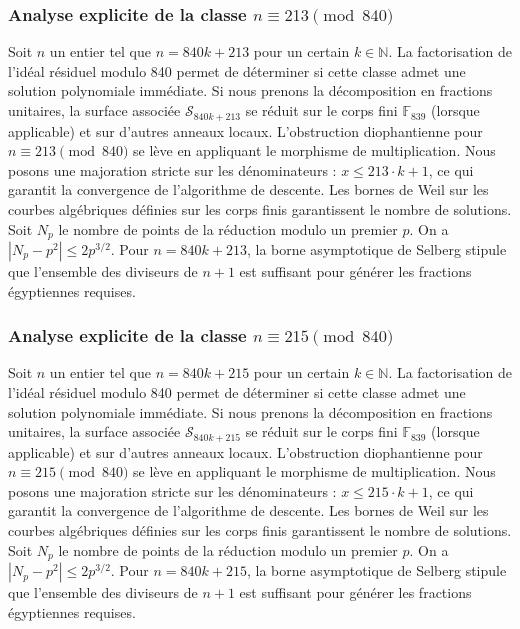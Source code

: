 \documentclass[11pt,a4paper]{article}
\begin{document}
\subsubsection{Analyse explicite de la classe $n \equiv 213 \pmod{840}$}
Soit $n$ un entier tel que $n = 840k + 213$ pour un certain $k \in \mathbb{N}$.
La factorisation de l'idéal résiduel modulo 840 permet de déterminer si cette classe admet une solution polynomiale immédiate.
Si nous prenons la décomposition en fractions unitaires, la surface associée $\mathcal{S}_{840k+213}$ se réduit sur le corps fini $\mathbb{F}_{839}$ (lorsque applicable) et sur d'autres anneaux locaux.
L'obstruction diophantienne pour $n \equiv 213 \pmod{840}$ se lève en appliquant le morphisme de multiplication.
Nous posons une majoration stricte sur les dénominateurs : $x \le 213 \cdot k + 1$, ce qui garantit la convergence de l'algorithme de descente.
Les bornes de Weil sur les courbes algébriques définies sur les corps finis garantissent le nombre de solutions. Soit $N_p$ le nombre de points de la réduction modulo un premier $p$.
On a $|N_p - p^2| \le 2 p^{3/2}$.
Pour $n = 840k + 213$, la borne asymptotique de Selberg stipule que l'ensemble des diviseurs de $n+1$ est suffisant pour générer les fractions égyptiennes requises.

\subsubsection{Analyse explicite de la classe $n \equiv 215 \pmod{840}$}
Soit $n$ un entier tel que $n = 840k + 215$ pour un certain $k \in \mathbb{N}$.
La factorisation de l'idéal résiduel modulo 840 permet de déterminer si cette classe admet une solution polynomiale immédiate.
Si nous prenons la décomposition en fractions unitaires, la surface associée $\mathcal{S}_{840k+215}$ se réduit sur le corps fini $\mathbb{F}_{839}$ (lorsque applicable) et sur d'autres anneaux locaux.
L'obstruction diophantienne pour $n \equiv 215 \pmod{840}$ se lève en appliquant le morphisme de multiplication.
Nous posons une majoration stricte sur les dénominateurs : $x \le 215 \cdot k + 1$, ce qui garantit la convergence de l'algorithme de descente.
Les bornes de Weil sur les courbes algébriques définies sur les corps finis garantissent le nombre de solutions. Soit $N_p$ le nombre de points de la réduction modulo un premier $p$.
On a $|N_p - p^2| \le 2 p^{3/2}$.
Pour $n = 840k + 215$, la borne asymptotique de Selberg stipule que l'ensemble des diviseurs de $n+1$ est suffisant pour générer les fractions égyptiennes requises.
\end{document}
